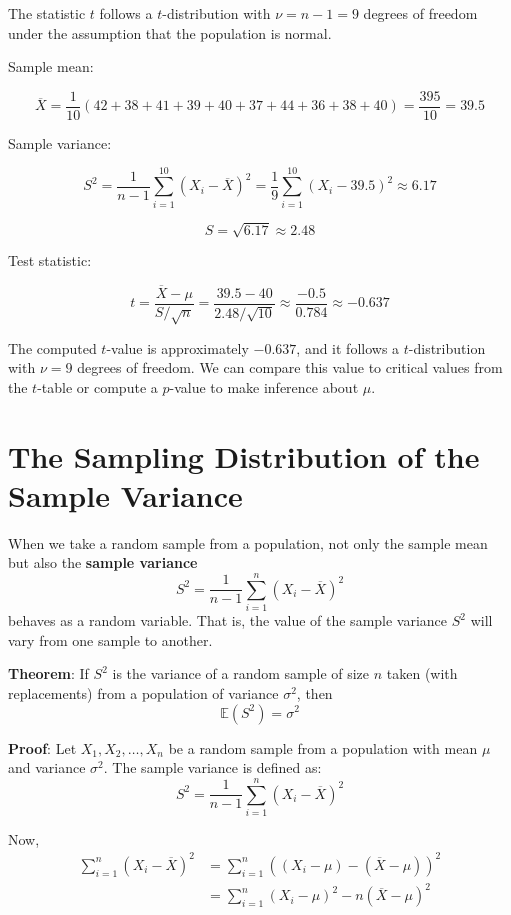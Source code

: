 \documentclass[twoside]{book}
\begin{document}
The statistic \( t \) follows a \( t \)-distribution with \( \nu = n - 1 = 9 \) degrees of freedom under the assumption that the population is normal.

Sample mean:

\[
\overline{X} = \frac{1}{10} (42 + 38 + 41 + 39 + 40 + 37 + 44 + 36 + 38 + 40) = \frac{395}{10} = 39.5
\]

Sample variance:

\[
S^2 = \frac{1}{n - 1} \sum_{i=1}^{10} (X_i - \overline{X})^2 = \frac{1}{9} \sum_{i=1}^{10} (X_i - 39.5)^2 \approx 6.17
\]

\[
S = \sqrt{6.17} \approx 2.48
\]

Test statistic:

\[
t = \frac{\overline{X} - \mu}{S / \sqrt{n}} = \frac{39.5 - 40}{2.48 / \sqrt{10}} \approx \frac{-0.5}{0.784} \approx -0.637
\]

The computed \( t \)-value is approximately \( -0.637 \), and it follows a \( t \)-distribution with \( \nu = 9 \) degrees of freedom. We can compare this value to critical values from the \( t \)-table or compute a \( p \)-value to make inference about \( \mu \).

\section{The Sampling Distribution of the Sample Variance}
When we take a random sample from a population, not only the sample mean but also the \textbf{sample variance} 
\[
S^2 = \frac{1}{n - 1} \sum_{i=1}^{n} (X_i - \overline{X})^2
\]
behaves as a random variable. That is, the value of the sample variance \( S^2 \) will vary from one sample to another. 

\begin{textbox}
\textbf{Theorem}: If $S^2$ is the variance of a random sample of size $n$ taken (with replacements) from a population of variance $\sigma^2$, then
\[
\mathbb{E}(S^2) = \sigma^2
\]
\end{textbox}

\textbf{Proof}: Let \( X_1, X_2, \dots, X_n \) be a random sample from a population with mean \( \mu \) and variance \( \sigma^2 \). The sample variance is defined as:
\[
S^2 = \frac{1}{n - 1} \sum_{i=1}^{n} (X_i - \overline{X})^2
\]

Now,
\begin{align*}
\sum_{i=1}^{n} (X_i - \overline{X})^2 &= \sum_{i=1}^{n} \left( (X_i - \mu) - (\overline{X} - \mu)\right) ^2\\
&= \sum_{i=1}^{n} (X_i - \mu)^2 - n(\overline{X} - \mu)^2
\end{align*}
\end{document}
